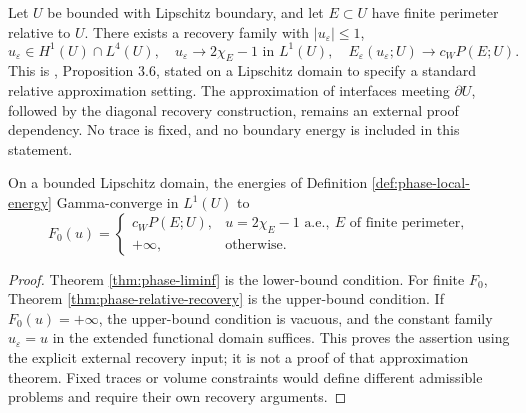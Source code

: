 \begin{theorem}\label{thm:phase-relative-recovery}
Let $U$ be bounded with Lipschitz boundary, and let $E\subset U$ have finite perimeter relative to $U$. There exists a recovery family with $|u_\varepsilon|\leq1$,
\[
 u_\varepsilon\in H^1(U)\cap L^4(U),\quad
 u_\varepsilon\to2\chi_E-1\text{ in }L^1(U),\quad
 E_\varepsilon(u_\varepsilon;U)\to c_WP(E;U).
\]
This is \cite{ChAC}, Proposition 3.6, stated on a Lipschitz domain to specify a standard relative approximation setting. The approximation of interfaces meeting $\partial U$, followed by the diagonal recovery construction, remains an external proof dependency. No trace is fixed, and no boundary energy is included in this statement.
\end{theorem}

\begin{corollary}\label{cor:phase-gamma-limit}
On a bounded Lipschitz domain, the energies of Definition \ref{def:phase-local-energy} Gamma-converge in $L^1(U)$ to
\[
 F_0(u)=
 \begin{cases}
 c_WP(E;U),&u=2\chi_E-1\text{ a.e.},\ E\text{ of finite perimeter},\\
 +\infty,&\text{otherwise}.
 \end{cases}
\]
\end{corollary}
\begin{proof}
Theorem \ref{thm:phase-liminf} is the lower-bound condition. For finite $F_0$, Theorem \ref{thm:phase-relative-recovery} is the upper-bound condition. If $F_0(u)=+\infty$, the upper-bound condition is vacuous, and the constant family $u_\varepsilon=u$ in the extended functional domain suffices. This proves the assertion using the explicit external recovery input; it is not a proof of that approximation theorem. Fixed traces or volume constraints would define different admissible problems and require their own recovery arguments.
\end{proof}

